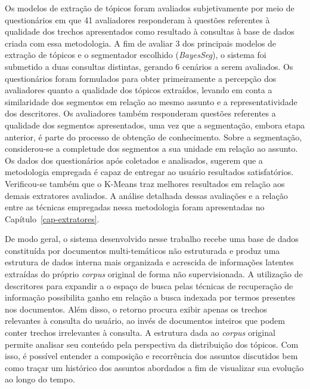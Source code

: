 Os modelos de extração de tópicos foram avaliados subjetivamente por meio de questionários em que 41 avaliadores responderam à questões referentes à qualidade dos trechos apresentados como resultado à consultas à base de dados criada com essa metodologia. 
A fim de avaliar 3 dos principais modelos de extração de tópicos e o segmentador escolhido (\textit{BayesSeg}), o sistema foi submetido a duas consultas distintas, gerando 6 cenários a serem avaliados. 
Os questionários foram formulados para obter primeiramente a percepção dos avaliadores quanto a qualidade dos tópicos extraídos, levando em conta a similaridade dos segmentos em relação ao mesmo assunto e a representatividade dos descritores. 
Os avaliadores também responderam questões referentes a qualidade dos segmentos apresentados, uma vez que a segmentação, embora etapa anterior, é parte do processo de obtenção de conhecimento. Sobre a segmentação, considerou-se a completude dos segmentos a sua unidade em relação ao assunto.
Os dados dos questionários após coletados e analisados, sugerem que a metodologia empregada é capaz de entregar ao usuário resultados satisfatórios. Verificou-se também que o K-Means traz melhores resultados em relação aos demais extratores avaliados. 
A análise detalhada dessas avaliações e a relação entre as técnicas empregadas nessa metodologia foram apresentadas no Capítulo~\ref{cap-extratores}.





De modo geral, o sistema desenvolvido nesse trabalho recebe uma base de dados constituída por documentos multi-temáticos não estruturada e produz uma estrutura de dados interna mais organizada e acrescida de informações latentes extraídas do próprio \textit{corpus} original de forma não supervisionada. 
A utilização de descritores para expandir a o espaço de busca pelas técnicas de recuperação de informação possibilita ganho em relação a busca indexada por termos presentes nos documentos. Além disso, o retorno procura exibir apenas os trechos relevantes à consulta do usuário, ao invés de documentos inteiros que podem conter trechos irrelevantes à consulta.  
A estrutura dada ao \textit{corpus} original permite analisar seu conteúdo pela perspectiva da distribuição dos tópicos. Com isso, é possível entender a composição e recorrência dos assuntos discutidos bem como traçar um histórico dos assuntos abordados a fim de visualizar sua evolução ao longo do tempo.


